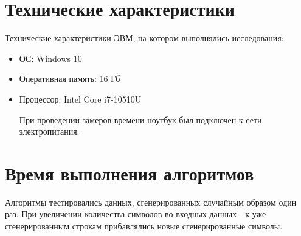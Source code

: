 \documentclass[12pt]{report}
\begin{document}
\newpage

\section{Технические характеристики}
Технические характеристики ЭВМ, на котором выполнялись исследования:
\begin{itemize}
\item ОС: Windows 10
\item Оперативная память: 16 Гб
\item Процессор: Intel Core i7-10510U

При проведении замеров времени ноутбук был подключен к сети электропитания.
\end{itemize}

\section{Время выполнения алгоритмов}
Алгоритмы тестировались данных, сгенерированных случайным образом один раз. При увеличении количества символов во входных данных - к уже сгенерированным строкам прибавлялись новые сгенерированные символы.
\end{document}
